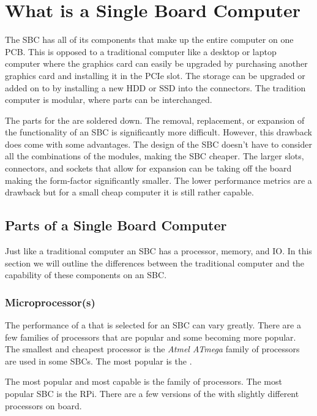 \chapter{What is a Single Board Computer}

The \ac{SBC} has all of its components that make up the entire computer on one \ac{PCB}. This is opposed to a traditional computer like a desktop or laptop computer where the graphics card can easily be upgraded by purchasing another graphics card and installing it in the \ac{PCIe} slot. The storage can be upgraded or added on to by installing a new \ac{HDD} or \ac{SSD} into the connectors. The tradition computer is modular, where parts can be interchanged.

The parts for the  are soldered down. The removal, replacement, or expansion of the functionality of an \ac{SBC} is significantly more difficult. However, this drawback does come with some advantages. The design of the \ac{SBC} doesn't have to consider all the combinations of the modules, making the \ac{SBC} cheaper. The larger slots, connectors, and sockets that allow for expansion can be taking off the board making the form-factor significantly smaller. The lower performance metrics are a drawback but for a small cheap computer it is still rather capable.

\section{Parts of a Single Board Computer}

Just like a traditional computer an \ac{SBC} has a processor, memory, and \ac{IO}. In this section we will outline the differences between the traditional computer and the capability of these components on an \ac{SBC}.
	
\subsection{Microprocessor(s)}

The performance of a  that is selected for an \ac{SBC} can vary greatly. There are a few families of processors that are popular and some becoming more popular. The smallest and cheapest processor is the \emph{Atmel ATmega} family of processors are used in some \ac{SBC}s. The most popular is the .

The most popular and most capable is the  family of processors. The most popular \ac{SBC} is the \ac{RPi}. There are a few versions of the  with slightly different  processors on board.

